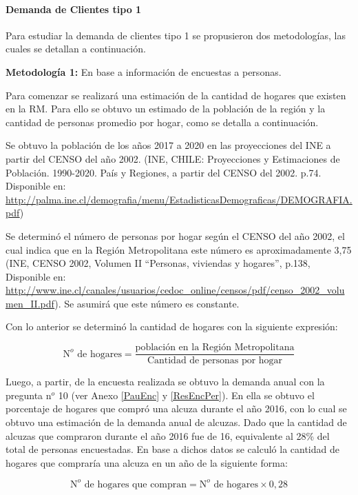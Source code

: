\paragraph{Demanda de Clientes tipo 1}

Para estudiar la demanda de clientes tipo 1 se propusieron dos metodologías, las cuales se detallan a continuación.

\textbf{Metodología 1:}  En base a información de encuestas a personas.

Para comenzar se realizará una estimación de la cantidad de hogares que existen en la RM.  Para ello se obtuvo un estimado de la población de la región y la cantidad de personas promedio por hogar, como se detalla a continuación.


Se obtuvo la población de los años 2017 a 2020 en las proyecciones del INE a partir del CENSO del año 2002. (INE, CHILE: Proyecciones y Estimaciones de Población. 1990-2020. País y Regiones, a partir del CENSO del 2002. p.74. Disponible en: \url{http://palma.ine.cl/demografia/menu/EstadisticasDemograficas/DEMOGRAFIA.pdf})

Se determinó el número de personas por hogar  según el CENSO del año 2002, el cual indica que en la Región Metropolitana este número es aproximadamente 3,75 (INE, CENSO 2002, Volumen II “Personas, viviendas y hogares”, p.138, Disponible en: \url{http://www.ine.cl/canales/usuarios/cedoc_online/censos/pdf/censo_2002_volumen_II.pdf}). Se asumirá que este número es constante.

Con lo anterior se determinó la cantidad de hogares con la siguiente expresión:

\begin{equation*}
\mbox{N}^o\text{ de hogares} = \frac{\text{población en la Región Metropolitana}}{\text{Cantidad de personas por hogar}}
\end{equation*}

Luego, a partir, de la encuesta realizada se obtuvo la demanda anual con la pregunta n$^o$ 10 (ver Anexo \ref{PauEnc} y \ref{ResEncPer}). En ella se obtuvo el porcentaje de hogares que compró una alcuza durante el año 2016, con lo cual se obtuvo una estimación de la demanda anual de alcuzas. Dado que la cantidad de alcuzas que compraron durante el año 2016 fue de 16, equivalente al 28\% del total de personas encuestadas. En base a dichos datos se calculó la cantidad de hogares que compraría una alcuza en un año de la siguiente forma:


\begin{equation*}
\mbox{N}^o\mbox{ de hogares que compran} = \mbox{N}^o\mbox{ de hogares}\times 0,28
\end{equation*}

